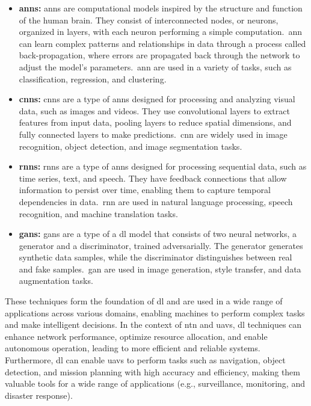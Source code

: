 \begin{itemize}
  \item \textbf{\glspl{ann}:} \glspl{ann} are computational models inspired by the structure and function of the human brain. They consist of interconnected nodes, or neurons, organized in layers, with each neuron performing a simple computation.\ \gls{ann} can learn complex patterns and relationships in data through a process called back-propagation, where errors are propagated back through the network to adjust the model's parameters.\ \gls{ann} are used in a variety of tasks, such as classification, regression, and clustering.

  \item \textbf{\glspl{cnn}:} \glspl{cnn} are a type of \glspl{ann} designed for processing and analyzing visual data, such as images and videos. They use convolutional layers to extract features from input data, pooling layers to reduce spatial dimensions, and fully connected layers to make predictions.\ \gls{cnn} are widely used in image recognition, object detection, and image segmentation tasks.

  \item \textbf{\glspl{rnn}:} \glspl{rnn} are a type of \glspl{ann} designed for processing sequential data, such as time series, text, and speech. They have feedback connections that allow information to persist over time, enabling them to capture temporal dependencies in data.\ \gls{rnn} are used in natural language processing, speech recognition, and machine translation tasks.

  \item \textbf{\glspl{gan}:} \glspl{gan} are a type of a \gls{dl} model that consists of two neural networks, a generator and a discriminator, trained adversarially. The generator generates synthetic data samples, while the discriminator distinguishes between real and fake samples.\ \gls{gan} are used in image generation, style transfer, and data augmentation tasks.
\end{itemize}

These techniques form the foundation of \gls{dl} and are used in a wide range of applications across various domains, enabling machines to perform complex tasks and make intelligent decisions. In the context of \gls{ntn} and \glspl{uav}, \gls{dl} techniques can enhance network performance, optimize resource allocation, and enable autonomous operation, leading to more efficient and reliable systems. Furthermore, \gls{dl} can enable \glspl{uav} to perform tasks such as navigation, object detection, and mission planning with high accuracy and efficiency, making them valuable tools for a wide range of applications (e.g., surveillance, monitoring, and disaster response).
